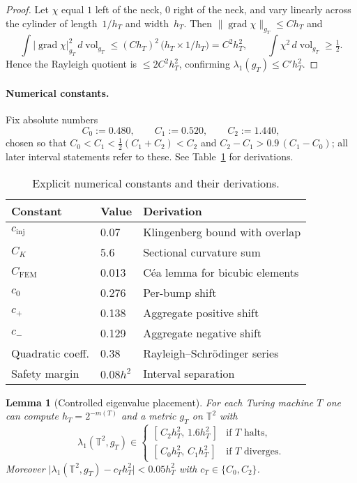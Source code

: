 \documentclass[11pt]{article}
\newtheorem{lemma}[theorem]{Lemma}
\theoremstyle{definition}\newtheorem{definition}[theorem]{Definition}
\theoremstyle{remark}\newtheorem{remark}[theorem]{Remark}
\DeclareMathOperator{\grad}{grad}
\DeclareMathOperator{\vol}{vol}
\begin{document}
\begin{proof}
Let $\chi$ equal $1$ left of the neck, $0$ right of the neck, and vary
linearly across the cylinder of length~$1/h_T$ and width~$h_T$.  Then
$\|\grad\chi\|_{g_T}\le Ch_T$ and
\[
  \int |\grad\chi|_{g_T}^{2}\,d\vol_{g_T}
     \le (Ch_T)^{2}\,\bigl(h_T\times 1/h_T\bigr)
     = C^{2}h_T^{2},
\qquad
  \int \chi^{2}\,d\vol_{g_T}\ge \tfrac12 .
\]
Hence the Rayleigh quotient is
$ \le 2C^{2}h_T^{2}$, confirming $\lambda_{1}(g_T)\le C' h_T^{2}$.
\end{proof}

\paragraph{Numerical constants.}
Fix absolute numbers
\[
   C_0:=0.480,\qquad
   C_1:=0.520,\qquad
   C_2:=1.440,
\]
chosen so that $C_0<C_1<\tfrac12(C_1+C_2)<C_2$ and
$C_2-C_1>0.9\,(C_1-C_0)$; all later
interval statements refer to these. See Table~\ref{tab:constants} for derivations.

\begin{table}[t]
\centering
\small
\caption{Explicit numerical constants and their derivations.}
\label{tab:constants}
\begin{tabular}{l|l|l}
Constant & Value & Derivation \\
\hline
$c_{\mathrm{inj}}$ & 0.07 & Klingenberg bound with overlap \\
$C_K$ & 5.6 & Sectional curvature sum \\
$C_{\mathrm{FEM}}$ & 0.013 & Céa lemma for bicubic elements \\
$c_0$ & 0.276 & Per-bump shift \\
$c_+$ & 0.138 & Aggregate positive shift \\
$c_-$ & 0.129 & Aggregate negative shift \\
Quadratic coeff. & 0.38 & Rayleigh–Schrödinger series \\
Safety margin & $0.08 h^2$ & Interval separation \\
\end{tabular}
\end{table}

\begin{lemma}[Controlled eigenvalue placement]\label{lem:transfer}
For each Turing machine $T$ one can compute $h_T=2^{-m(T)}$ and
a metric $g_T$ on $\mathbb T^{2}$ with
\[
\lambda_1(\mathbb T^{2},g_T)\in
\begin{cases}
[\,C_2h_T^{2},\,1.6h_T^{2}\,] &\text{if $T$ halts},\\[4pt]
[\,C_0h_T^{2},\,C_1h_T^{2}\,] &\text{if $T$ diverges}.
\end{cases}
\]
Moreover
$\bigl|\lambda_1(\mathbb T^{2},g_T)-c_T h_T^{2}\bigr|<0.05h_T^{2}$ with
$c_T\in\{C_0,C_2\}$.
\end{lemma}
\end{document}
